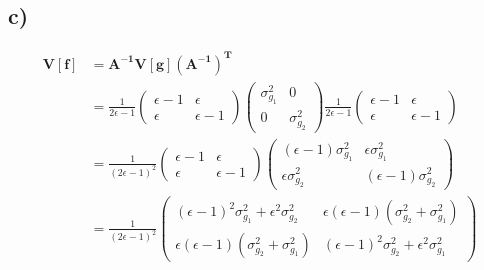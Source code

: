 \subsection*{c)}
\begin{align}
    \mathbf{V}[\mathbf{f}]
        &=  \mathbf{A^{-1}V}[\mathbf{g}]\mathbf{\left(A^{-1}\right)^T}\nonumber\\
        &=  \frac{1}{2\epsilon-1} \left(\begin{matrix}
                    \epsilon - 1 & \epsilon\\
                    \epsilon     & \epsilon - 1
                 \end{matrix}\right)
            \left(\begin{matrix}
                \sigma_{g_1}^2 & 0\\
                0 & \sigma_{g_2}^2
            \end{matrix} \right)
            \frac{1}{2\epsilon-1} \left(\begin{matrix}
                    \epsilon - 1 & \epsilon\\
                    \epsilon     & \epsilon - 1
                 \end{matrix}\right)\nonumber\\
        &=  \frac{1}{(2\epsilon-1)^2} \left(\begin{matrix}
                \epsilon -1 & \epsilon\\
                \epsilon & \epsilon -1
            \end{matrix} \right)
            \left(\begin{matrix}
                (\epsilon-1)\sigma_{g_1}^2 & \epsilon \sigma_{g_1}^2\\
                \epsilon \sigma_{g_2}^2 & (\epsilon-1)\sigma_{g_2}^2
            \end{matrix} \right)\nonumber\\
        &=  \frac{1}{(2\epsilon-1)^2} \left(\begin{matrix}
                (\epsilon-1)^2\sigma_{g_1}^2 + \epsilon^2 \sigma_{g_2}^2 & \epsilon (\epsilon-1) (\sigma_{g_2}^2+\sigma_{g_1}^2)\\
                \epsilon (\epsilon-1) (\sigma_{g_2}^2+\sigma_{g_1}^2) & (\epsilon-1)^2\sigma_{g_2}^2 + \epsilon^2 \sigma_{g_1}^2
            \end{matrix} \right)
\end{align}

